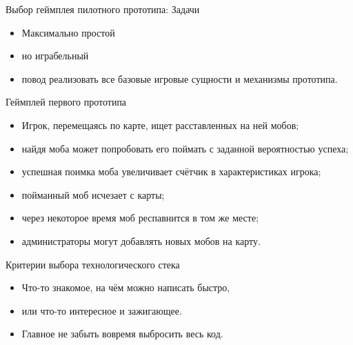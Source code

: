 \documentclass[aspectratio=169,handout,bigger]{beamer}
\begin{document}
\begin{frame}{Выбор геймплея пилотного прототипа: Задачи}
  \begin{itemize}
    \item Максимально простой
    \item но играбельный
    \item повод реализовать все базовые игровые сущности и механизмы прототипа.
  \end{itemize}
\end{frame}


\begin{frame}{Геймплей первого прототипа}
  \begin{itemize}
    \item Игрок, перемещаясь по карте, ищет расставленных на ней мобов;
    \item найдя моба может попробовать его поймать с заданной вероятностью успеха;
    \item успешная поимка моба увеличивает счётчик в характеристиках игрока;
    \item пойманный моб исчезает с карты;
    \item через некоторое время моб респавнится в том же месте;
    \item администраторы могут добавлять новых мобов на карту.
  \end{itemize}
\end{frame}


\begin{frame}{Критерии выбора технологического стека}
  \begin{itemize}
    \item Что-то знакомое, на чём можно написать быстро,
    \item или что-то интересное и зажигающее.
    \item Главное не забыть вовремя выбросить весь код.
  \end{itemize}
\end{frame}

\end{document}
